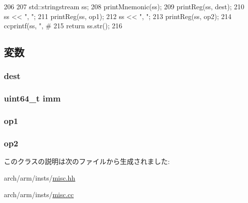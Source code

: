 \begin{DoxyCode}
206 {
207     std::stringstream ss;
208     printMnemonic(ss);
209     printReg(ss, dest);
210     ss << ", ";
211     printReg(ss, op1);
212     ss << ", ";
213     printReg(ss, op2);
214     ccprintf(ss, ", #%
215     return ss.str();
216 }
\end{DoxyCode}


\subsection{変数}
\hypertarget{classRegRegRegImmOp_aec72e8e45bdc87abeeeb75d2a8a9a716}{
\subsubsection[{dest}]{ {\bf dest}}}
\label{classRegRegRegImmOp_aec72e8e45bdc87abeeeb75d2a8a9a716}
\hypertarget{classRegRegRegImmOp_a2b4406ad2843b5aa12d244d01d8fdc69}{
\subsubsection[{imm}]{\setlength{\rightskip}{0pt plus 5cm}uint64\_\-t {\bf imm}}}
\label{classRegRegRegImmOp_a2b4406ad2843b5aa12d244d01d8fdc69}
\hypertarget{classRegRegRegImmOp_a4c465c43ad568f8bcf8ae71480e9cfea}{
\subsubsection[{op1}]{ {\bf op1}}}
\label{classRegRegRegImmOp_a4c465c43ad568f8bcf8ae71480e9cfea}
\hypertarget{classRegRegRegImmOp_a7799ff6cbe5a252199059eb8665820e7}{
\subsubsection[{op2}]{ {\bf op2}}}
\label{classRegRegRegImmOp_a7799ff6cbe5a252199059eb8665820e7}


このクラスの説明は次のファイルから生成されました:\begin{DoxyCompactItemize}
\item 
arch/arm/insts/\hyperlink{arch_2arm_2insts_2misc_8hh}{misc.hh}\item 
arch/arm/insts/\hyperlink{arch_2arm_2insts_2misc_8cc}{misc.cc}\end{DoxyCompactItemize}
